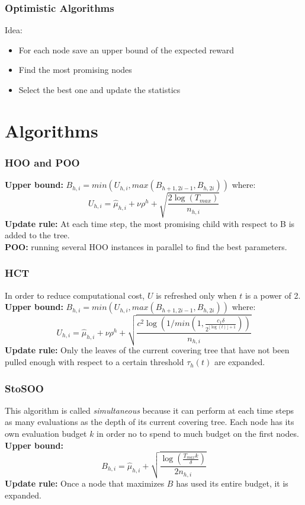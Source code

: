 \documentclass[xcolor={usenames,dvipsnames}]{beamer}
\begin{document}
\begin{frame}
\frametitle{Optimistic Algorithms}
Idea:
\begin{itemize}
\item For each node save an upper bound of the expected reward
\item Find the most promising nodes
\item Select the best one and update the statistics
\end{itemize}

\end{frame}

\section{Algorithms}
\begin{frame}
\frametitle{HOO and POO}

\textbf{Upper bound:} $B_{h,i}=min(U_{h,i},max(B_{h+1,2i-1},B_{h,2i}))$ where:
\begin{equation}
\label{uhoo}
U_{h,i}=\widehat{\mu}_{h,i}+\nu \rho^h+\sqrt{\dfrac{2\log(T_{max})}{n_{h,i}}}
\end{equation}
\textbf{Update rule:} At each time step, the most promising child with respect to B is added to the tree.\\
\vspace{0.5cm}
\textbf{POO:} running several HOO instances in parallel to find the best parameters.


\end{frame}

\begin{frame}
\frametitle{HCT}
In order to reduce computational cost, $U$ is refreshed only when $t$ is a power of 2.\\
\textbf{Upper bound:} $B_{h,i}=min(U_{h,i},max(B_{h+1,2i-1},B_{h,2i}))$ where:
\begin{equation}
\label{uhct}
U_{h,i}=\widehat{\mu}_{h,i}+\nu \rho^h+\sqrt{\dfrac{c^2\log(1/min(1,\frac{c_1\delta}{2^{\lfloor \log(t) \rfloor + 1}}))}{n_{h,i}}}
\end{equation}
\textbf{Update rule:} Only the leaves of the current covering tree that have not been pulled enough with respect to a certain threshold $\tau_h(t)$ are expanded.
\end{frame}

\begin{frame}
\frametitle{StoSOO}
This algorithm is called \textit{simultaneous} because it can perform at each time steps as many evaluations as the depth of its current covering tree. Each node has its own evaluation budget $k$ in order no to spend to much budget on the first nodes.\\
\textbf{Upper bound:}
\begin{equation}
\label{bsoo}
B_{h,i}=\widehat{\mu}_{h,i}+\sqrt{\dfrac{\log(\frac{T_{max}k}{\delta})}{2n_{h,i}}}
\end{equation}
\textbf{Update rule:} Once a node that maximizes $B$ has used its entire budget, it is expanded.
\end{frame}
\end{document}
